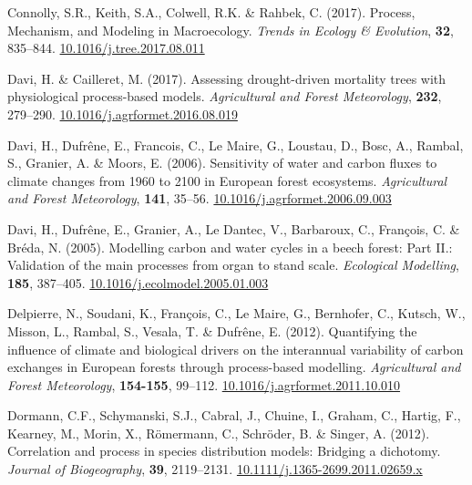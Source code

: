 \documentclass[11pt,]{article}
\newlength{\cslhangindent}
\newenvironment{CSLReferences}[2] %
 {%
  \setlength{\parindent}{0pt}
  \ifodd #1 \everypar{\setlength{\hangindent}{\cslhangindent}}\ignorespaces\fi
  \ifnum #2 > 0
  \setlength{\parskip}{#2\baselineskip}
  \fi
 }%
 {}
\begin{document}
\begin{CSLReferences}{1}{0}
\leavevmode{}%
Connolly, S.R., Keith, S.A., Colwell, R.K. \& Rahbek, C. (2017).
Process, {Mechanism}, and {Modeling} in {Macroecology}. \emph{Trends in
Ecology \& Evolution}, \textbf{32}, 835--844.
\href{https://doi.org/10.1016/j.tree.2017.08.011}{10.1016/j.tree.2017.08.011}

\leavevmode{}%
Davi, H. \& Cailleret, M. (2017). Assessing drought-driven mortality
trees with physiological process-based models. \emph{Agricultural and
Forest Meteorology}, \textbf{232}, 279--290.
\href{https://doi.org/10.1016/j.agrformet.2016.08.019}{10.1016/j.agrformet.2016.08.019}

\leavevmode{}%
Davi, H., Dufrêne, E., Francois, C., Le Maire, G., Loustau, D., Bosc,
A., Rambal, S., Granier, A. \& Moors, E. (2006). Sensitivity of water
and carbon fluxes to climate changes from 1960 to 2100 in {European}
forest ecosystems. \emph{Agricultural and Forest Meteorology},
\textbf{141}, 35--56.
\href{https://doi.org/10.1016/j.agrformet.2006.09.003}{10.1016/j.agrformet.2006.09.003}

\leavevmode{}%
Davi, H., Dufrêne, E., Granier, A., Le Dantec, V., Barbaroux, C.,
François, C. \& Bréda, N. (2005). Modelling carbon and water cycles in a
beech forest: {Part} {II}.: {Validation} of the main processes from
organ to stand scale. \emph{Ecological Modelling}, \textbf{185},
387--405.
\href{https://doi.org/10.1016/j.ecolmodel.2005.01.003}{10.1016/j.ecolmodel.2005.01.003}

\leavevmode{}%
Delpierre, N., Soudani, K., François, C., Le Maire, G., Bernhofer, C.,
Kutsch, W., Misson, L., Rambal, S., Vesala, T. \& Dufrêne, E. (2012).
Quantifying the influence of climate and biological drivers on the
interannual variability of carbon exchanges in {European} forests
through process-based modelling. \emph{Agricultural and Forest
Meteorology}, \textbf{154-155}, 99--112.
\href{https://doi.org/10.1016/j.agrformet.2011.10.010}{10.1016/j.agrformet.2011.10.010}

\leavevmode{}%
Dormann, C.F., Schymanski, S.J., Cabral, J., Chuine, I., Graham, C.,
Hartig, F., Kearney, M., Morin, X., Römermann, C., Schröder, B. \&
Singer, A. (2012). Correlation and process in species distribution
models: Bridging a dichotomy. \emph{Journal of Biogeography},
\textbf{39}, 2119--2131.
\href{https://doi.org/10.1111/j.1365-2699.2011.02659.x}{10.1111/j.1365-2699.2011.02659.x}


\end{CSLReferences}
\end{document}
